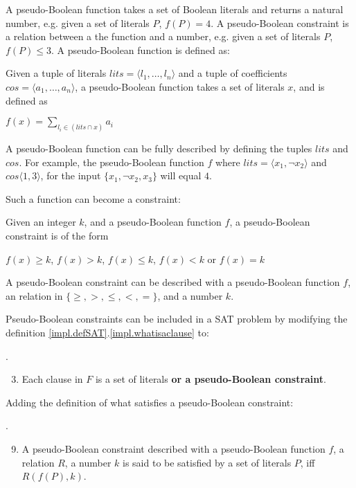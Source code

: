 A pseudo-Boolean function takes a set of Boolean literals and returns a natural number, e.g. given a set of literals $P$, $f(P) = 4$.
A pseudo-Boolean constraint is a relation between a the function and a number, e.g. given a set of literals $P$, $f(P) \leq 3$.
A pseudo-Boolean function is defined as:
\begin{defs}
\label{impl.PBfunction}
Given a tuple of literals $lits = \langle l_1,\ldots,l_n \rangle$ and a tuple of coefficients $cos = \langle a_1,\ldots,a_n\rangle$,
a pseudo-Boolean function takes a set of literals $x$, and is defined as

$f(x) = \sum \limits_{l_i \in (lits \cap x)} a_i$
\end{defs}
A pseudo-Boolean function can be fully described by defining the tuples $lits$ and $cos$.
For example, the pseudo-Boolean function $f$ where $lits = \langle x_1, \neg x_2\rangle$ and $cos \langle 1,3\rangle$,
for the input $\{x_1,\neg x_2,x_3\}$ will equal $4$.

Such a function can become a constraint:
\begin{defs}
\label{impl.PBConstraint}
Given an integer $k$, and a pseudo-Boolean function $f$, a pseudo-Boolean constraint is of the form

$f(x) \geq k$, $f(x) > k$, $f(x) \leq k$, $f(x) < k$ or $f(x) = k$


\end{defs}
A pseudo-Boolean constraint can be described with a pseudo-Boolean function $f$, an relation in $\{\geq,>,\leq,<,=\}$, and a number $k$.

Pseudo-Boolean constraints can be included in a SAT problem by modifying the definition \ref{impl.defSAT}.\ref{impl.whatisaclause} to:
\begin{defs}
.
\begin{enumerate}
\setcounter{enumi}{2}
	\item Each clause in $F$ is a set of literals \textbf{or a pseudo-Boolean constraint}.
\end{enumerate}

\end{defs}

Adding the definition of what satisfies a pseudo-Boolean constraint:
\begin{defs}
.
\begin{enumerate}
\setcounter{enumi}{8}
  \item A pseudo-Boolean constraint described with a pseudo-Boolean function $f$, a relation $R$, a number $k$ is said to be satisfied by a set of literals $P$,
	  iff $R(f(P),k)$.
\end{enumerate}
\end{defs}

